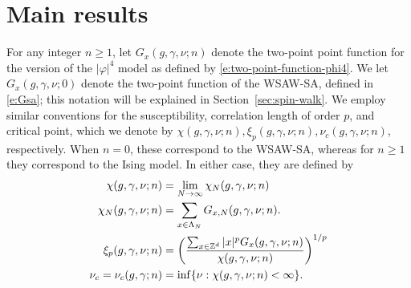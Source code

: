 \section{Main results}

For any integer $n \ge 1$, let $G_x(g, \gamma, \nu; n)$
denote the two-point point function for the version of the $|\varphi|^4$ model
as defined by \eqref{e:two-point-function-phi4}.
We let $G_x(g, \gamma, \nu; 0)$ denote the two-point function of the WSAW-SA,
defined in \eqref{e:Gsa}; this notation will be explained in Section~\ref{sec:spin-walk}.
We employ similar conventions for the susceptibility, correlation length of order $p$,
and critical point, which we denote by
$\chi(g, \gamma, \nu; n), \xi_p(g, \gamma, \nu; n), \nu_c(g, \gamma, \nu; n)$, respectively.
When $n = 0$, these correspond to the WSAW-SA, whereas for $n \ge 1$ they correspond to the
Ising model. In either case, they are defined by
\begin{align}
\label{e:chilim}
\chi(g, \gamma, \nu; n)
	&= \lim_{N\rightarrow\infty} \chi_N(g, \gamma, \nu; n) \\
\label{e:chiNdef}
\chi_N(g, \gamma, \nu; n)
	&= \sum_{x\in\Lambda_N} G_{x,N}(g, \gamma, \nu; n). \\
\label{e:clp}
\xi_p(g, \gamma, \nu; n)
	&= \left(\frac{\sum_{x\in{ {{\mathbb Z}}^d }} |x|^p G_x(g, \gamma, \nu; n)}{\chi(g, \gamma, \nu; n)}\right)^{1/p} \\
\label{e:nuc-def}
\nu_c
	= \nu_c(g, \gamma; n) &= \inf \{ \nu : \chi(g, \gamma, \nu; n) < \infty \}.
\end{align}


